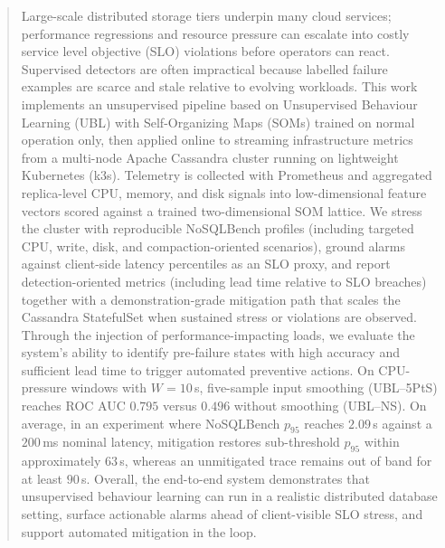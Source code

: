 \documentclass[sigconf]{acmart}
\begin{document}
\begin{abstract}
  Large-scale distributed storage tiers underpin many cloud services; performance regressions and resource pressure can escalate into costly service level objective (SLO) violations before operators can react. Supervised detectors are often impractical because labelled failure examples are scarce and stale relative to evolving workloads. This work implements an unsupervised pipeline based on Unsupervised Behaviour Learning (UBL) with Self-Organizing Maps (SOMs) trained on normal operation only, then applied online to streaming infrastructure metrics from a multi-node Apache Cassandra cluster running on lightweight Kubernetes (k3s). Telemetry is collected with Prometheus and aggregated replica-level CPU, memory, and disk signals into low-dimensional feature vectors scored against a trained two-dimensional SOM lattice. We stress the cluster with reproducible NoSQLBench profiles (including targeted CPU, write, disk, and compaction-oriented scenarios), ground alarms against client-side latency percentiles as an SLO proxy, and report detection-oriented metrics (including lead time relative to SLO breaches) together with a demonstration-grade mitigation path that scales the Cassandra StatefulSet when sustained stress or violations are observed. Through the injection of performance-impacting loads, we evaluate the system's ability to identify pre-failure states with high accuracy and sufficient lead time to trigger automated preventive actions. On CPU-pressure windows with $W{=}10$\,s, five-sample input smoothing (UBL--5PtS) reaches ROC AUC $0.795$ versus $0.496$ without smoothing (UBL--NS). On average, in an experiment where NoSQLBench $p_{95}$ reaches $2.09$\,s against a $200$\,ms nominal latency, mitigation restores sub-threshold $p_{95}$ within approximately $63$\,s, whereas an unmitigated trace remains out of band for at least $90$\,s. Overall, the end-to-end system demonstrates that unsupervised behaviour learning can run in a realistic distributed database setting, surface actionable alarms ahead of client-visible SLO stress, and support automated mitigation in the loop.
\end{abstract}
\end{document}

